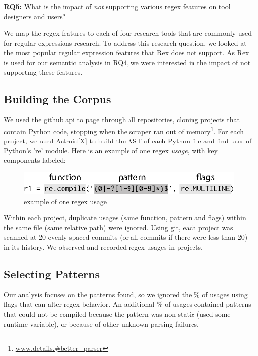 \textbf{RQ5:} What is the impact of \emph{not} supporting various regex features  on tool designers and users? 

We map the regex features to each of four research tools that are commonly used for regular expressions research. 
To address this research question, we looked at the most popular regular expression features that Rex does not support. As Rex is used for our semantic analysis in RQ4, we were interested in the impact of not supporting these features. 




\subsection{Building the Corpus}
\label{study:corpus}
We used the github api to page through all repositories, cloning projects that contain Python code, stopping when the scraper ran out of memory\footnote{\url{www.details.#better_parser}}.  For each project, we used Astroid[X] to build the AST of each Python file and find uses of Python's 're' module.  Here is an example of one regex \emph{usage}, with key components labeled:

\begin{figure}[htb]
\centering
\includegraphics[width=\columnwidth]{../illustrations/exampleUsage.eps}
\caption{example of one regex usage}
\label{fig:exampleUsage}
\end{figure}

Within each project, duplicate usages (same function, pattern and flags) within the same file (same relative path) were ignored.  Using git, each project was scanned at 20 evenly-spaced commits (or all commits if there were less than 20) in its history.  We observed and recorded  regex usages in  projects.

\subsection{Selecting Patterns}
Our analysis focuses on the patterns found, so we ignored the \%  of usages using flags that can alter regex behavior.  An additional \% of usages contained patterns that could not be compiled because the pattern was non-static (used some runtime variable), or because of other unknown parsing failures.

